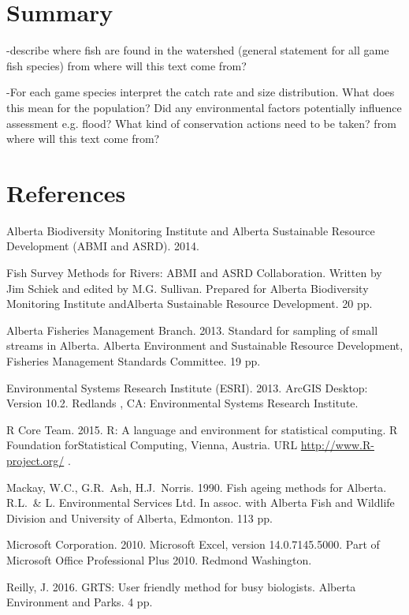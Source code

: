 \documentclass[]{article}\usepackage[]{graphicx}\usepackage[]{color}
\begin{document}
\clearpage
\section{Summary}
-describe where fish are found in the watershed (general statement for all game fish species) {\Large from where will this text come from?}


-For each game species interpret the catch rate and size distribution. What does this mean for the population? Did any environmental factors potentially influence assessment e.g. flood? What kind of conservation actions need to be taken? {\Large from where will this text come from?}

\clearpage
\section{References}


\noindent Alberta Biodiversity Monitoring Institute and Alberta Sustainable Resource Development (ABMI and ASRD). 2014. 

\noindent Fish Survey Methods for Rivers: ABMI and ASRD Collaboration. 
Written by Jim Schiek and edited by M.G. Sullivan. 
Prepared for Alberta Biodiversity Monitoring Institute andAlberta Sustainable Resource Development. 20 pp.

\noindent Alberta Fisheries Management Branch. 2013. 
Standard for sampling of small streams in Alberta. 
Alberta  Environment and Sustainable Resource Development, Fisheries Management Standards 	Committee. 19 pp.

\noindent Environmental Systems Research Institute (ESRI). 2013. 
ArcGIS Desktop: Version 10.2. Redlands , CA: 
Environmental Systems Research Institute.

\noindent R Core Team. 2015. R: A language and environment for statistical computing. R Foundation forStatistical Computing, Vienna, Austria. URL \url{http://www.R-project.org/} .


\noindent Mackay, W.C., G.R.\ Ash, H.J.\ Norris. 1990. Fish ageing methods for Alberta. R.L.\ \& L. Environmental Services Ltd. In assoc. with Alberta Fish and Wildlife Division and University of Alberta, Edmonton. 113 pp.

\noindent Microsoft Corporation. 2010. Microsoft Excel, version 14.0.7145.5000.  
Part of Microsoft Office Professional Plus 2010. Redmond Washington.

\noindent Reilly, J. 2016. GRTS: User friendly method for busy biologists. 
Alberta Environment and Parks. 4 pp.
\end{document}
